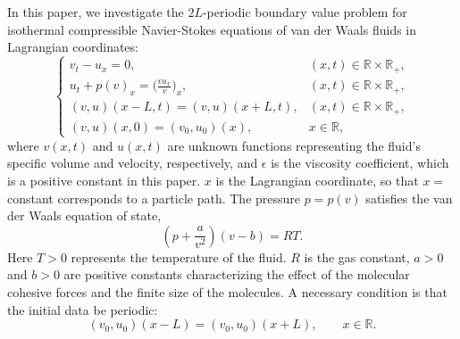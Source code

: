 \documentclass[a4paper,oneside,11pt]{article}
\numberwithin{equation}{section}
\begin{document}
In this paper, we investigate the $2L$-periodic boundary value problem for isothermal compressible Navier-Stokes equations of van der Waals fluids in Lagrangian coordinates:
\begin{equation}\label{ns-lagrange}
\left\{\begin{array}{llll}
\displaystyle v_{t}-u_{x}=0,& (x,t)\in\mathbb{R}\times\mathbb{R}_+,\\
\displaystyle u_{t}+p(v)_{x}=\big(\frac{\epsilon u_{x}}{v}\big)_{x},  & (x,t)\in\mathbb{R}\times\mathbb{R}_+,\\
\displaystyle (v,u)(x-L,t)=(v,u)(x+L,t), & (x,t)\in\mathbb{R}\times\mathbb{R}_+,\\
\displaystyle  (v,u)(x,0)=(v_0,u_0)(x), & x\in\mathbb{R},
\end{array}\right.
\end{equation}
where $v(x,t)$ and $u(x,t)$ are unknown functions representing the fluid's specific volume and velocity, respectively, and $\epsilon$ is the viscosity coefficient, which is a positive constant in this paper. $x$ is the Lagrangian coordinate, so that $x=$constant corresponds to a particle path. 
The pressure $p=p(v)$ satisfies the van der Waals equation of state,
\begin{equation}\label{p-f}
\left(p+\frac{a}{v^2}\right)(v-b)=RT.
\end{equation}
Here  $T>0$ represents the temperature of the fluid. $R$ is the gas constant,  $a>0$ and $b>0$ are positive constants characterizing the effect of the molecular cohesive forces and the finite size of the molecules. 
A necessary condition is that the initial data be periodic:
\begin{equation*}
	(v_0,u_0)(x-L)=(v_0,u_0)(x+L),\qquad x\in\mathbb{R}.
\end{equation*} 
\end{document}
